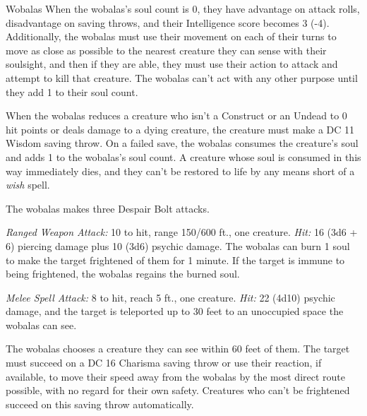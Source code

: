 \documentclass[10pt,a4paper,twoside,bg=print,twocolumn,openany,nodeprecatedcode]{dndbook}
\begin{document}
\begin{DndMonster}[float=t]{Wobalas}
\DndMonsterBasics[
armor-class = {17 (natural armor)},
hit-points = {\DndDice{24d8 + 48}},
speed = {30 ft.}
]
\DndMonsterAbilityScores[
 str = 14,
 dex = 22,
 con = 14,
 int = 16,
 wis = 18,
 cha = 18
]
\DndMonsterDetails[
saving-throws = {Dex +10, Wis +8, Cha +8},
skills = {Deception +8, Intimidation +8, Perception +8},
senses = {darkvision 120 ft., soulsight 30 ft., passive perception 18},
languages = {Abyssal, Common, telepathy 120 ft.},
challenge = 10,
]
When the wobalas's soul count is 0, they have advantage on attack rolls, disadvantage on saving throws, and their Intelligence score becomes 3 (-4). Additionally, the wobalas must use their movement on each of their turns to move as close as possible to the nearest creature they can sense with their soulsight, and then if they are able, they must use their action to attack and attempt to kill that creature. The wobalas can't act with any other purpose until they add 1 to their soul count.

When the wobalas reduces a creature who isn't a Construct or an Undead to 0 hit points or deals damage to a dying creature, the creature must make a DC 11 Wisdom saving throw. On a failed save, the wobalas consumes the creature's soul and adds 1 to the wobalas's soul count. A creature whose soul is consumed in this way immediately dies, and they can't be restored to life by any means short of a \textit{wish} spell.

The wobalas makes three Despair Bolt attacks.

\textsl{Ranged Weapon Attack:} 10 to hit, range 150/600 ft., one creature. \textsl{Hit:} 16 (3d6 + 6) piercing damage plus 10 (3d6) psychic damage. The wobalas can burn 1 soul to make the target frightened of them for 1 minute. If the target is immune to being frightened, the wobalas regains the burned soul.

\textsl{Melee Spell Attack:} 8 to hit, reach 5 ft., one creature. \textsl{Hit:} 22 (4d10) psychic damage, and the target is teleported up to 30 feet to an unoccupied space the wobalas can see.

The wobalas chooses a creature they can see within 60 feet of them. The target must succeed on a DC 16 Charisma saving throw or use their reaction, if available, to move their speed away from the wobalas by the most direct route possible, with no regard for their own safety. Creatures who can't be frightened succeed on this saving throw automatically.

\end{DndMonster}
\end{document}
